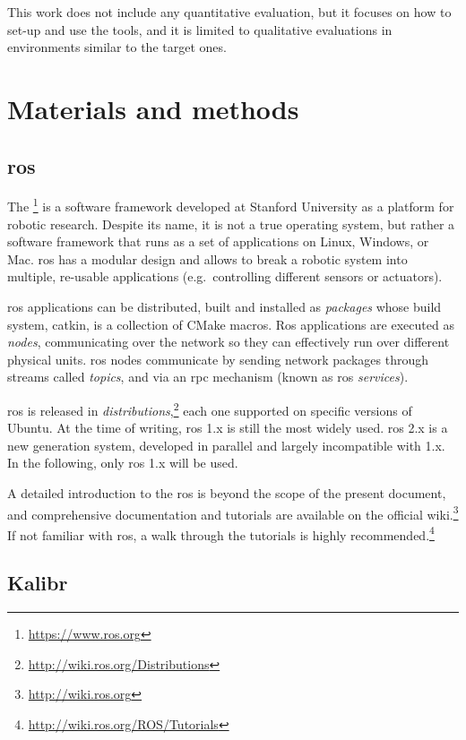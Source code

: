 \documentclass[11pt, letterpaper, twoside]{article}
\begin{document}
This work does not include any quantitative evaluation, but it focuses on how
to set-up and use the tools, and it is limited to qualitative evaluations in
environments similar to the target ones.

\section{Materials and methods}

\subsection{\acs{ros}}

The \footnote{\url{https://www.ros.org}} is a software framework
developed at Stanford University as a platform for robotic research. Despite
its name, it is not a true operating system, but rather a software framework
that runs as a set of applications on Linux, Windows, or Mac. \gls{ros} has a
modular design and allows to break a robotic system into multiple, re-usable
applications (e.g.\ controlling different sensors or actuators).

\gls{ros} applications can be distributed, built and installed as
\textit{packages} whose build system, catkin, is a collection of CMake macros.
Ros applications are executed as \textit{nodes}, communicating over the network
so they can effectively run over different physical units. \gls{ros} nodes
communicate by sending network packages through streams called \textit{topics},
and via an \gls{rpc} mechanism (known as \gls{ros} \textit{services}).

\gls{ros} is released in
\textit{distributions},\footnote{\url{http://wiki.ros.org/Distributions}} each
one supported on specific versions of Ubuntu. At the time of writing, \gls{ros}
1.x is still the most widely used. \gls{ros} 2.x is a new generation system,
developed in parallel and largely incompatible with 1.x. In the following, only
\gls{ros} 1.x will be used.

A detailed introduction to the \gls{ros} is beyond the scope of the present
document, and comprehensive documentation and tutorials are available on the
official wiki.\footnote{\url{http://wiki.ros.org}} If not familiar with
\gls{ros}, a walk through the tutorials is highly
recommended.\footnote{\url{http://wiki.ros.org/ROS/Tutorials}}

\subsection{Kalibr}\label{sec:kalibr}
\end{document}
